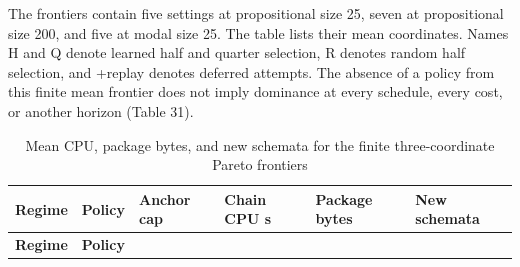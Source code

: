 \documentclass[pdflatex,sn-basic,Numbered]{sn-jnl}
\begin{document}
The frontiers contain five settings at propositional size 25, seven at propositional size 200, and five at modal size 25. The table lists their mean coordinates. Names H and Q denote learned half and quarter selection, R denotes random half selection, and +replay denotes deferred attempts. The absence of a policy from this finite mean frontier does not imply dominance at every schedule, every cost, or another horizon (Table 31).

\begingroup
\small
\setlength{\tabcolsep}{3pt}
\renewcommand{\arraystretch}{1.13}

\begin{longtable}[]{@{}
  >{\raggedright\arraybackslash}p{}
  >{\raggedright\arraybackslash}p{}
  >{\raggedleft\arraybackslash}p{}
  >{\raggedleft\arraybackslash}p{}
  >{\raggedleft\arraybackslash}p{}
  >{\raggedleft\arraybackslash}p{}@{}}
\caption{Mean CPU, package bytes, and new schemata for the finite three-coordinate Pareto frontiers}\label{tab:31}\tabularnewline
\toprule\noalign{}
\begin{minipage}[b]{\linewidth}\raggedright
\textbf{Regime}
\end{minipage} & \begin{minipage}[b]{\linewidth}\raggedright
\textbf{Policy}
\end{minipage} & \begin{minipage}[b]{\linewidth}\raggedleft
\textbf{Anchor cap}
\end{minipage} & \begin{minipage}[b]{\linewidth}\raggedleft
\textbf{Chain CPU s}
\end{minipage} & \begin{minipage}[b]{\linewidth}\raggedleft
\textbf{Package bytes}
\end{minipage} & \begin{minipage}[b]{\linewidth}\raggedleft
\textbf{New schemata}
\end{minipage} \\
\midrule\noalign{}
\endfirsthead
\toprule\noalign{}
\begin{minipage}[b]{\linewidth}\raggedright
\textbf{Regime}
\end{minipage} & \begin{minipage}[b]{\linewidth}\raggedright
\textbf{Policy}
\end{minipage} & \begin{minipage}[b]{\linewidth}\raggedleft

\end{minipage}
\end{longtable}
\end{document}

